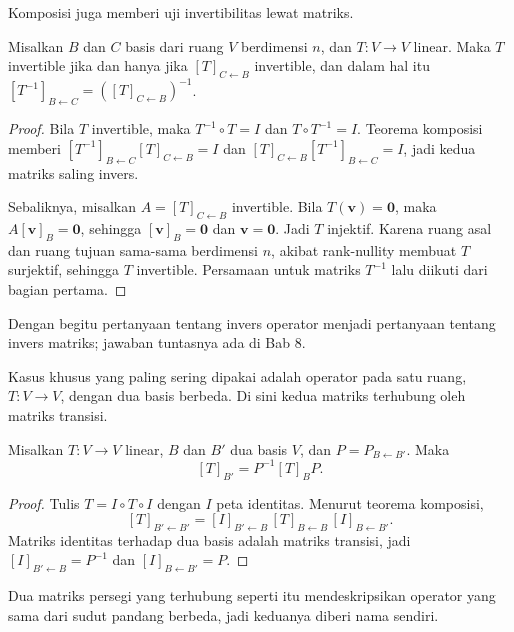 Komposisi juga memberi uji invertibilitas lewat matriks.

\begin{proposisi}
Misalkan $B$ dan $C$ basis dari ruang $V$ berdimensi $n$, dan $T\colon V\to V$ linear. Maka
$T$ invertible jika dan hanya jika $[T]_{C\leftarrow B}$ invertible, dan dalam hal itu
$[T^{-1}]_{B\leftarrow C}=([T]_{C\leftarrow B})^{-1}$.
\end{proposisi}

\begin{proof}
Bila $T$ invertible, maka $T^{-1}\circ T=I$ dan $T\circ T^{-1}=I$. Teorema komposisi memberi
$[T^{-1}]_{B\leftarrow C}[T]_{C\leftarrow B}=I$ dan
$[T]_{C\leftarrow B}[T^{-1}]_{B\leftarrow C}=I$, jadi kedua matriks saling invers.

Sebaliknya, misalkan $A=[T]_{C\leftarrow B}$ invertible. Bila $T(\mathbf{v})=\mathbf{0}$, maka
$A[\mathbf{v}]_{B}=\mathbf{0}$, sehingga $[\mathbf{v}]_{B}=\mathbf{0}$ dan
$\mathbf{v}=\mathbf{0}$.
Jadi $T$ injektif. Karena ruang asal dan ruang tujuan sama-sama berdimensi $n$, akibat
rank-nullity membuat $T$ surjektif, sehingga $T$ invertible. Persamaan untuk matriks
$T^{-1}$
lalu diikuti dari bagian pertama.
\end{proof}

Dengan begitu pertanyaan tentang invers operator menjadi pertanyaan tentang invers
matriks; jawaban tuntasnya ada di Bab 8.

Kasus khusus yang paling sering dipakai adalah operator pada satu ruang, $T\colon V\to V$,
dengan dua basis berbeda. Di sini kedua matriks terhubung oleh matriks transisi.

\begin{teorema}
Misalkan $T\colon V\to V$ linear, $B$ dan $B'$ dua basis $V$, dan $P=P_{B\leftarrow B'}$.
Maka
\[
  [T]_{B'}=P^{-1}[T]_{B}P .
\]
\end{teorema}

\begin{proof}
Tulis $T=I\circ T\circ I$ dengan $I$ peta identitas. Menurut teorema komposisi,
\[
  [T]_{B'\leftarrow B'}=[I]_{B'\leftarrow B}\,[T]_{B\leftarrow B}\,[I]_{B\leftarrow B'}.
\]
Matriks identitas terhadap dua basis adalah matriks transisi, jadi
$[I]_{B'\leftarrow B}=P^{-1}$ dan $[I]_{B\leftarrow B'}=P$.
\end{proof}

Dua matriks persegi yang terhubung seperti itu mendeskripsikan operator yang sama dari
sudut pandang berbeda, jadi keduanya diberi nama sendiri.

